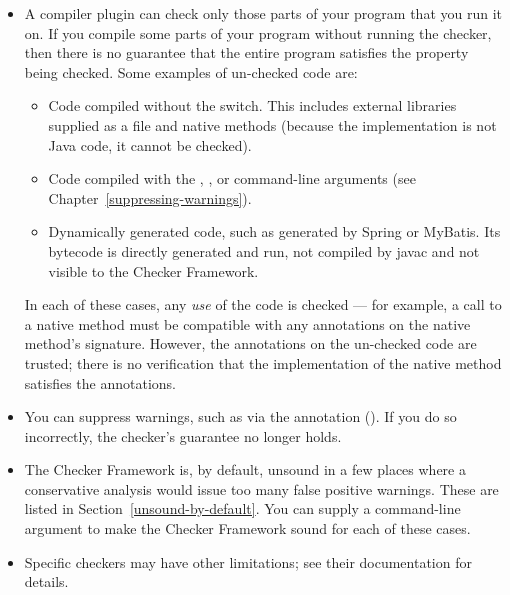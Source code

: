 \begin{itemize}

\item
  A compiler plugin can check only those parts of your program that you run
  it on.  If you compile some parts of your program without running the
  checker, then there is no guarantee that the entire program satisfies the
  property being checked.  Some examples of un-checked code are:

  \begin{itemize}
  \item
    Code compiled without the  switch.  This includes
    external libraries supplied as a  file and native methods
    (because the implementation is not Java code, it cannot be checked).
  \item
    Code compiled with the , ,  or 
    command-line arguments (see Chapter~\ref{suppressing-warnings}).
  \item
    Dynamically generated code, such as generated by Spring or MyBatis.
    Its bytecode is directly generated and run, not compiled by javac and
    not visible to the Checker Framework.
  \end{itemize}

  In each of these cases, any \emph{use} of the code is checked --- for
  example, a call to a native method must be compatible with any
  annotations on the native method's signature.
  However, the annotations on the un-checked code are trusted; there is no
  verification that the implementation of the native method satisfies the
  annotations.

\item
  You can suppress warnings, such as via the 
  annotation ().  If you do so
  incorrectly, the checker's guarantee no longer holds.

\item
  The Checker Framework is, by default, unsound in a few places where a
  conservative analysis would issue too many false positive warnings.
  These are listed in Section~\ref{unsound-by-default}.
  You can supply a command-line argument to make the Checker Framework
  sound for each of these cases.


\item
  Specific checkers may have other limitations; see their documentation for
  details.

\end{itemize}

